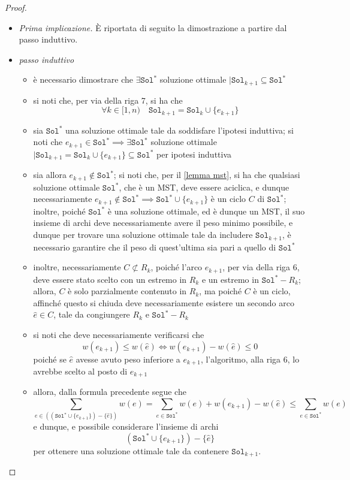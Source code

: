 \documentclass[a4paper, 12pt]{report}
\begin{document}
\begin{proof}
        \begin{itemize}
            \item[] \textit{Prima implicazione.} È riportata di seguito la dimostrazione a partire dal passo induttivo. 
            \item \textit{passo induttivo}
                \begin{itemize}
                    \item è necessario dimostrare che $\exists \texttt{Sol}^*$ soluzione ottimale $\mid \texttt{Sol}_{k + 1} \subseteq \texttt{Sol}^*$
                    \item si noti che, per via della riga 7, si ha che $$\forall k \in [1, n) \quad \texttt{Sol}_{k +1} = \texttt{Sol}_k \cup \{e_{k +1}\}$$
                    \item sia $\texttt{Sol}^*$ una soluzione ottimale tale da soddisfare l'ipotesi induttiva; si noti che $e_{k +1} \in \texttt{Sol}^* \implies \exists \texttt{Sol}^*$ soluzione ottimale $\mid \texttt{Sol}_{k +1} = \texttt{Sol}_k \cup \{e_{k +1}\} \subseteq \texttt{Sol}^*$ per ipotesi induttiva
                    \item sia allora $e_{k +1} \notin \texttt{Sol}^*$; si noti che, per il \cref{lemma mst}, si ha che qualsiasi soluzione ottimale $\texttt{Sol}^*$, che è un MST, deve essere aciclica, e dunque necessariamente $e_{k +1} \notin \texttt{Sol}^* \implies \texttt{Sol}^* \cup \{e_{k +1}\}$ è un ciclo $C$ di $\texttt{Sol}^*$; inoltre, poiché $\texttt{Sol}^*$ è una soluzione ottimale, ed è dunque un MST, il suo insieme di archi deve necessariamente avere il peso minimo possibile, e dunque per trovare una soluzione ottimale tale da includere $\texttt{Sol}_{k + 1}$, è necessario garantire che il peso di quest'ultima sia pari a quello di $\texttt{Sol}^*$
                    \item inoltre, necessariamente $C \not \subset R_k$, poiché l'arco $e_{k + 1}$, per via della riga 6, deve essere stato scelto con un estremo in $R_k$ e un estremo in $\texttt{Sol}^* - R_k$; allora, $C$ è solo parzialmente contenuto in $R_k$, ma poiché $C$ è un ciclo, affinché questo si chiuda deve necessariamente esistere un secondo arco $\hat e \in C$, tale da congiungere $R_k$ e $\texttt{Sol}^* - R_k$
                    \item si noti che deve necessariamente verificarsi che $$w(e_{k +1}) \le w(\hat e) \iff w(e_{k +1}) - w(\hat e) \le 0$$ poiché se $\hat e$ avesse avuto peso inferiore a $e_{k +1}$, l'algoritmo, alla riga 6, lo avrebbe scelto al posto di $e_{k +1}$
                    \item allora, dalla formula precedente segue che $$\displaystyle \sum_{e \in ((\texttt{Sol}^* \cup \{e_{k +1}\} )- \{\hat e\} )}{w(e)}  = \sum_{e \in \texttt{Sol}^*}{w(e)} + w(e_{k +1}) - w(\hat e) \le \sum_{e \in \texttt{Sol}^*}{w(e)}$$ e dunque, e possibile considerare l'insieme di archi $$(\texttt{Sol}^* \cup \{e_{k+1}\}) - \{\hat e\}$$ per ottenere una soluzione ottimale tale da contenere $\texttt{Sol}_{k + 1}$.
                \end{itemize}


\end{itemize}
\end{proof}
\end{document}
